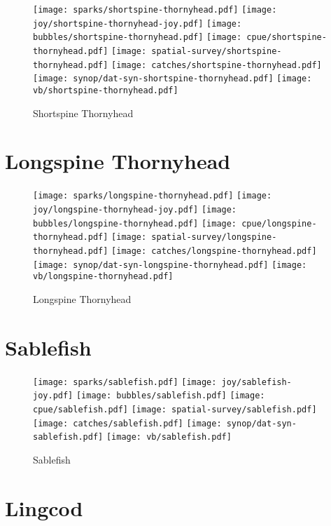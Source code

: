 \begin{figure}[htbp]
\centering
\texttt{[image: sparks/shortspine-thornyhead.pdf]}
\texttt{[image: joy/shortspine-thornyhead-joy.pdf]}
\texttt{[image: bubbles/shortspine-thornyhead.pdf]}
\texttt{[image: cpue/shortspine-thornyhead.pdf]}
\texttt{[image: spatial-survey/shortspine-thornyhead.pdf]}
\texttt{[image: catches/shortspine-thornyhead.pdf]}
\texttt{[image: synop/dat-syn-shortspine-thornyhead.pdf]}
\texttt{[image: vb/shortspine-thornyhead.pdf]}
\caption{Shortspine Thornyhead}
\end{figure}
\clearpage
\section{Longspine Thornyhead}

\begin{figure}[htbp]
\centering
\texttt{[image: sparks/longspine-thornyhead.pdf]}
\texttt{[image: joy/longspine-thornyhead-joy.pdf]}
\texttt{[image: bubbles/longspine-thornyhead.pdf]}
\texttt{[image: cpue/longspine-thornyhead.pdf]}
\texttt{[image: spatial-survey/longspine-thornyhead.pdf]}
\texttt{[image: catches/longspine-thornyhead.pdf]}
\texttt{[image: synop/dat-syn-longspine-thornyhead.pdf]}
\texttt{[image: vb/longspine-thornyhead.pdf]}
\caption{Longspine Thornyhead}
\end{figure}
\clearpage
\section{Sablefish}

\begin{figure}[htbp]
\centering
\texttt{[image: sparks/sablefish.pdf]}
\texttt{[image: joy/sablefish-joy.pdf]}
\texttt{[image: bubbles/sablefish.pdf]}
\texttt{[image: cpue/sablefish.pdf]}
\texttt{[image: spatial-survey/sablefish.pdf]}
\texttt{[image: catches/sablefish.pdf]}
\texttt{[image: synop/dat-syn-sablefish.pdf]}
\texttt{[image: vb/sablefish.pdf]}
\caption{Sablefish}
\end{figure}
\clearpage
\section{Lingcod}

